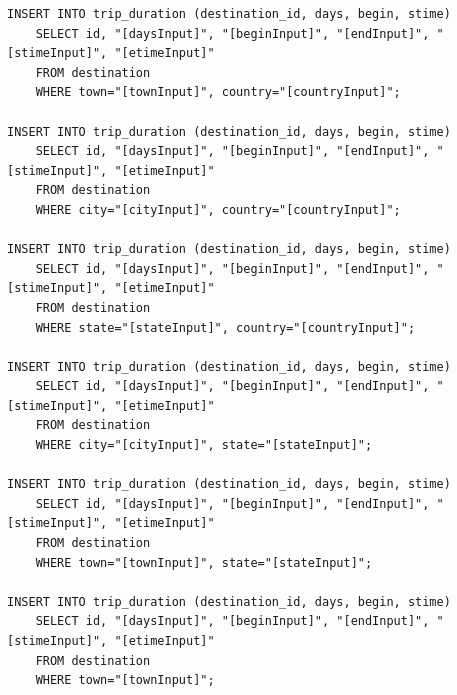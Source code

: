 \documentclass[letterpaper,10pt,onecolumn,compsoc]{IEEEtran}
\begin{document}
\begin{verbatim}
INSERT INTO trip_duration (destination_id, days, begin, stime) 
	SELECT id, "[daysInput]", "[beginInput]", "[endInput]", "[stimeInput]", "[etimeInput]" 
	FROM destination 
	WHERE town="[townInput]", country="[countryInput]";
	
INSERT INTO trip_duration (destination_id, days, begin, stime) 
	SELECT id, "[daysInput]", "[beginInput]", "[endInput]", "[stimeInput]", "[etimeInput]" 
	FROM destination 
	WHERE city="[cityInput]", country="[countryInput]";
	
INSERT INTO trip_duration (destination_id, days, begin, stime) 
	SELECT id, "[daysInput]", "[beginInput]", "[endInput]", "[stimeInput]", "[etimeInput]" 
	FROM destination 
	WHERE state="[stateInput]", country="[countryInput]";
	
INSERT INTO trip_duration (destination_id, days, begin, stime) 
	SELECT id, "[daysInput]", "[beginInput]", "[endInput]", "[stimeInput]", "[etimeInput]" 
	FROM destination 
	WHERE city="[cityInput]", state="[stateInput]";
	
INSERT INTO trip_duration (destination_id, days, begin, stime) 
	SELECT id, "[daysInput]", "[beginInput]", "[endInput]", "[stimeInput]", "[etimeInput]" 
	FROM destination 
	WHERE town="[townInput]", state="[stateInput]";
	
INSERT INTO trip_duration (destination_id, days, begin, stime) 
	SELECT id, "[daysInput]", "[beginInput]", "[endInput]", "[stimeInput]", "[etimeInput]" 
	FROM destination 
	WHERE town="[townInput]";
\end{verbatim}

\newpage
\end{document}
